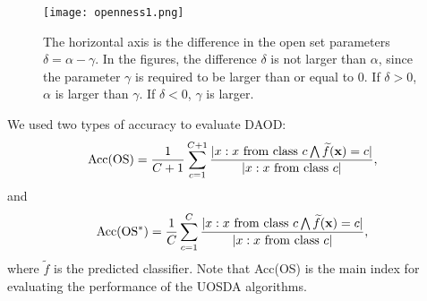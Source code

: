 \documentclass[journal]{IEEEtran}
\begin{document}
\begin{figure*}[t]
\centering
\texttt{[image: openness1.png]}
\caption{The horizontal axis is the difference in the open set parameters $\delta=\alpha-\gamma$. In the figures, the difference $\delta$ is not  larger than  $\alpha$, since the parameter $\gamma$ is required to be larger than or equal to $0$. If $\delta>0$, $\alpha$ is larger than $\gamma$. If $\delta<0$, $\gamma$ is larger.}
\end{figure*}



We used two  types of accuracy \cite{DBLP:conf/iccv/BustoG17,DBLP:conf/eccv/SaitoYUH18} to evaluate DAOD:
\vspace{-0.cm}
\begin{equation}\label{100}
    {\rm Acc{(OS)}}=\frac{1}{C+1}\sum_{c=1}^{C+1}\frac{|x:x~{\rm from~class~} c \bigwedge \widetilde{f}(\mathbf{x})=c|}{|x:x ~{\rm from ~class~ } c |},
\end{equation}
and
\begin{equation}\label{101}
    {\rm Acc{(OS^*)}}=\frac{1}{C}\sum_{c=1}^{C}\frac{|x:x~{\rm from~class~} c \bigwedge \widetilde{f}(\mathbf{x})=c|}{|x:x ~{\rm from ~class~ } c |},
\end{equation}
where  $\widetilde{f}$ is the predicted classifier. Note that Acc(OS) is the main index for evaluating the performance of the UOSDA algorithms\cite{DBLP:conf/iccv/BustoG17}.
\end{document}
